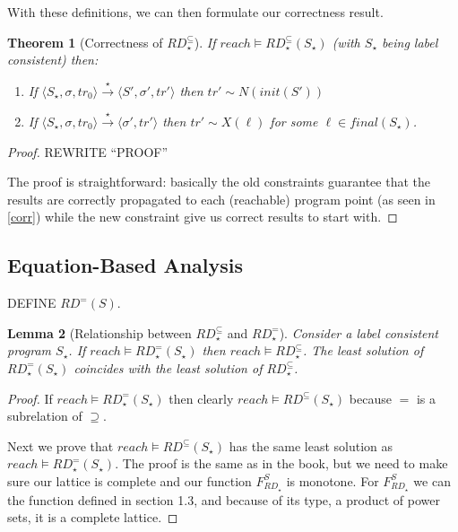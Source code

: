 \documentclass[a4wide,12pt]{article}
\theoremstyle{definition}
\theoremstyle{plain}
\newtheorem{theo}{Theorem}
\newtheorem{lemma}[theo]{Lemma}
\theoremstyle{remark}
\def\const#1{\mathopen{\langle}#1\mathclose{\rangle}} %
\def\pair#1{\const{#1}}
\def\starto{\overset{\star}{\to}}
\def\rdsub{RD^\subseteq(S_\star)}
\begin{document}
With these definitions, we can then formulate our correctness result.
\begin{theo}[Correctness of $RD^\subseteq_\star$]
If $reach \models RD_\star^\subseteq(S_\star)$ (with $S_\star$ being label consistent) then:

\begin{enumerate}
\item If $\pair{S_\star, \sigma, tr_0} \starto \pair{S', \sigma', tr'}$ then $ tr' \sim
N(init(S'))$ 
\item If $\pair{S_\star, \sigma, tr_0} \starto \pair{\sigma', tr'}$ then $ tr' \sim
X(\ell)$ for some $\ell \in final(S_\star)$.
\end{enumerate}
\end{theo}
\begin{proof}
REWRITE ``PROOF''
 
The proof is straightforward: basically the old constraints guarantee that the results are correctly propagated to each (reachable)
program point (as seen in \ref{corr}) while the new constraint give us correct results to start with.
\end{proof}

 
\subsection*{Equation-Based Analysis}

DEFINE $RD^=(S)$.


\begin{lemma}[Relationship between $RD_\star^\subseteq$ and $RD_\star^=$]
Consider a label consistent program $S_\star$.  If $reach \models RD_\star^=(S_\star)$
then $reach \models RD_\star^\subseteq$. The least solution of $RD_\star^=(S_\star)$ coincides
with the least solution of $RD_\star^\subseteq$.
\end{lemma}
\begin{proof}
If $reach \models RD_\star^=(S_\star)$
then clearly $reach \models \rdsub$ because $=$ is a subrelation of $\supseteq$.

Next we prove that $reach \models \rdsub$ has the same least solution
as  $reach \models RD_\star^=(S_\star)$. The proof is the same as in the book, but we
need to make sure our lattice is complete and our function $F_{RD_\star}^S$ is monotone.
For $F_{RD_\star}^S$ we can the function defined in section 1.3, and because of its
type, a product of power sets, it is a complete lattice.
\end{proof}
\end{document}
